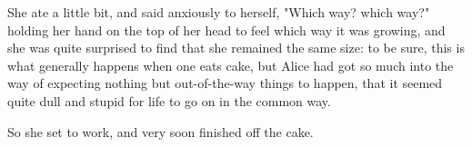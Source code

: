 \documentclass[aps,prb,amsmath,twocolumn,amssymb,titlepage]{revtex4-2}
\begin{document}
She ate a little bit, and said anxiously to herself, "Which way? which way?" holding her hand on the top of her head to feel which way it was growing, and she was quite surprised to find that she remained the same size: to be sure, this is what generally happens when one eats cake, but Alice had got so much into the way of expecting nothing but out-of-the-way things to happen, that it seemed quite dull and stupid for life to go on in the common way.

So she set to work, and very soon finished off the cake.\cite{carroll1867alice}




\end{document}
